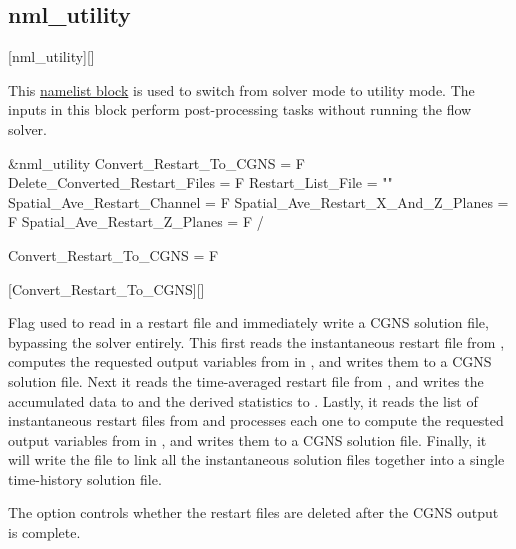 \subsection{nml\_utility}
\label{SEC:nml_utility}
\inp*[nmlUtility]{}[nml\_utility][]

This \hyperref[SEC:User_Input]{namelist block}
is used to switch from solver mode to utility mode.
%
\NOTE
The inputs in this block perform post-processing tasks
without running the flow solver.

\begin{nmlblocklst}[
,label={LST:nml_utility}
,caption={Namelist nml\_utility.}
]
&nml_utility
  Convert_Restart_To_CGNS            = F
  Delete_Converted_Restart_Files     = F
  Restart_List_File                  = ""
  Spatial_Ave_Restart_Channel        = F
  Spatial_Ave_Restart_X_And_Z_Planes = F
  Spatial_Ave_Restart_Z_Planes       = F
/
\end{nmlblocklst}


\begin{nmldescitem}
Convert_Restart_To_CGNS = F
\end{nmldescitem}
[Convert\_Restart\_To\_CGNS][]

\begin{nmldescbody}
Flag used to read in a restart file and immediately write a CGNS solution
file, bypassing the solver entirely.
%
This first reads the instantaneous restart file from
,
computes the requested output variables from
 in ,
and writes them to a CGNS solution file.
%
Next it reads the time-averaged restart file from
, 
and writes the accumulated data to 
and the derived statistics to .
%
Lastly, it reads the list of instantaneous restart files from
and processes each one to compute the requested output variables from
 in ,
and writes them to a CGNS solution file.
%
Finally, it will write the file  to
link all the instantaneous solution files together into a single time-history
solution file.

The option 
controls whether the restart files are deleted after the CGNS output
is complete.
\end{nmldescbody}

